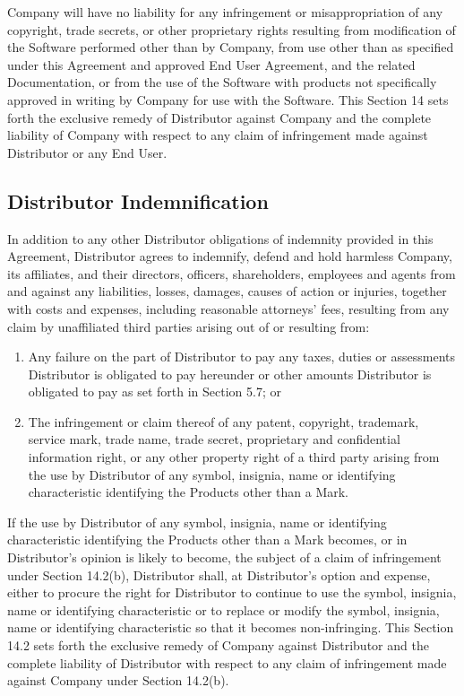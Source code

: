 \documentclass[letterpaper,10pt,openany,oneside,english]{sphinxmanual}
\begin{document}
Company will have no liability for any infringement or misappropriation of any copyright, trade secrets, or other proprietary rights resulting from modification of the Software performed other than by Company, from use other than as specified under this Agreement and approved End User Agreement, and the related Documentation, or from the use of the Software with products not specifically approved in writing by Company for use with the Software. This Section 14 sets forth the exclusive remedy of Distributor against Company and the complete liability of Company with respect to any claim of infringement made against Distributor or any End User.


\subsection{Distributor Indemnification}
\label{\detokenize{indemnification:distributor-indemnification}}
In addition to any other Distributor obligations of indemnity provided in this Agreement, Distributor agrees to indemnify, defend and hold harmless Company, its affiliates, and their directors, officers, shareholders, employees and agents from and against any liabilities, losses, damages, causes of action or injuries, together with costs and expenses, including reasonable attorneys’ fees, resulting from any claim by unaffiliated third parties arising out of or resulting from:
\begin{enumerate}
\item {} 
Any failure on the part of Distributor to pay any taxes, duties or assessments Distributor is obligated to pay hereunder or other amounts Distributor is obligated to pay as set forth in Section 5.7; or

\item {} 
The infringement or claim thereof of any patent, copyright, trademark, service mark, trade name, trade secret, proprietary and confidential information right, or any other property right of a third party arising from the use by Distributor of any symbol, insignia, name or identifying characteristic identifying the Products other than a Mark.

\end{enumerate}

If  the use by Distributor of any symbol, insignia, name or identifying characteristic identifying the Products other than a Mark becomes, or in Distributor’s opinion is likely to become, the subject of a claim of infringement under Section 14.2(b), Distributor shall, at Distributor’s option and expense, either to procure the right for Distributor to continue to use the symbol, insignia, name or identifying characteristic or to replace or modify the symbol, insignia, name or identifying characteristic  so that it becomes non-infringing. This Section 14.2 sets forth the exclusive remedy of Company against Distributor and the complete liability of Distributor with respect to any claim of infringement made against Company under Section 14.2(b).
\end{document}
